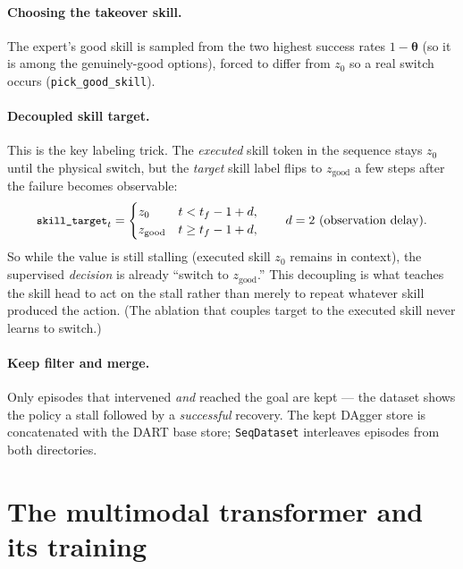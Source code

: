 \documentclass[11pt]{article}
\newcommand{\theem}{\bm{\theta}}
\newcommand{\skill}{z}
\newcommand{\code}[1]{\texttt{\small #1}}
\begin{document}
\paragraph{Choosing the takeover skill.}
The expert's good skill is sampled from the two highest success rates
$1-\theem$ (so it is among the genuinely-good options), forced to differ from
$\skill_0$ so a real switch occurs (\code{pick\_good\_skill}).

\paragraph{Decoupled skill target.}
This is the key labeling trick. The \emph{executed} skill token in the sequence stays
$\skill_0$ until the physical switch, but the \emph{target} skill label flips to
$\skill_{\mathrm{good}}$ a few steps after the failure becomes observable:
\begin{equation}
\code{skill\_target}_t =
\begin{cases}
\skill_0 & t < t_f-1+d,\\
\skill_{\mathrm{good}} & t \ge t_f-1+d,
\end{cases}
\qquad d=2\ \text{(observation delay)}.
\end{equation}
So while the value is still stalling (executed skill $\skill_0$ remains in context),
the supervised \emph{decision} is already ``switch to $\skill_{\mathrm{good}}$.'' This
decoupling is what teaches the skill head to act on the stall rather than merely to
repeat whatever skill produced the action. (The ablation that couples target to the
executed skill never learns to switch.)

\paragraph{Keep filter and merge.}
Only episodes that intervened \emph{and} reached the goal are kept --- the dataset
shows the policy a stall followed by a \emph{successful} recovery. The kept DAgger
store is concatenated with the DART base store; \code{SeqDataset} interleaves episodes
from both directories.

\section{The multimodal transformer and its training}
\label{sec:transformer}
\end{document}
